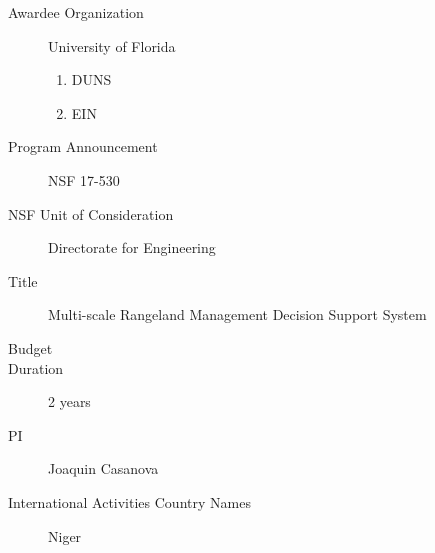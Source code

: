 


\begin{description}
\item [Awardee Organization] University of Florida              
\begin{enumerate}
\item DUNS
\item EIN
\end{enumerate}
\item [Program Announcement] NSF 17-530
\item [NSF Unit of Consideration] Directorate for Engineering
\item [Title] Multi-scale Rangeland Management Decision Support System
\item [Budget]
\item [Duration] 2 years
\item [PI] Joaquin Casanova
\item [International Activities Country Names] Niger
\end{description}
